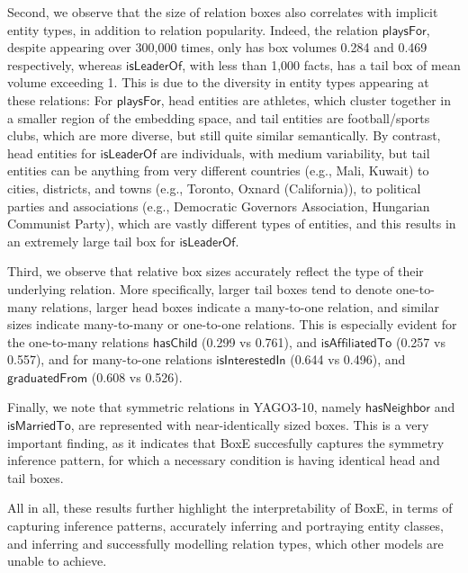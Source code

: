 \documentclass{article}
\begin{document}
Second, we observe that the size of relation boxes also correlates with implicit entity types, in addition to relation popularity.
Indeed, the relation $\mathsf{playsFor}$, despite appearing over 300,000 times, only has box volumes 0.284 and 0.469 respectively, whereas $\mathsf{isLeaderOf}$, with less than 1,000 facts, has a tail box of mean volume exceeding 1. This is due to the diversity in entity types appearing at these relations: For $\mathsf{playsFor}$, head entities are athletes, which cluster together in a smaller region of the embedding space, and tail entities are football/sports clubs, which are more diverse, but still quite similar semantically. By contrast, head entities for $\mathsf{isLeaderOf}$ are individuals, with medium variability, but tail entities can be anything from very different countries (e.g., Mali, Kuwait) to cities, districts, and towns (e.g., Toronto, Oxnard (California)), to political parties and associations (e.g., Democratic Governors Association, Hungarian Communist Party), which are vastly different types of entities, and this results in an extremely large tail box for $\mathsf{isLeaderOf}$. 

Third, we observe that relative box sizes accurately reflect the type of their underlying relation. More specifically, larger tail boxes tend to denote one-to-many relations, larger head boxes indicate a many-to-one relation, and similar sizes indicate many-to-many or one-to-one relations. This is especially evident for the one-to-many relations $\mathsf{hasChild}$ (0.299 vs 0.761), and $\mathsf{isAffiliatedTo}$ (0.257 vs 0.557), and for many-to-one relations $\mathsf{isInterestedIn}$ (0.644 vs 0.496), and $\mathsf{graduatedFrom}$ (0.608 vs 0.526). 

Finally, we note that symmetric relations in YAGO3-10, namely $\mathsf{hasNeighbor}$ and $\mathsf{isMarriedTo}$, are represented with near-identically sized boxes. This is a very important finding, as it indicates that BoxE succesfully captures the symmetry inference pattern, for which a necessary condition is having identical head and tail boxes. 

All in all, these results further highlight the interpretability of BoxE, in terms of capturing inference patterns, accurately inferring and portraying entity classes, and inferring and successfully modelling relation types, which other models are unable to achieve. 
\end{document}
